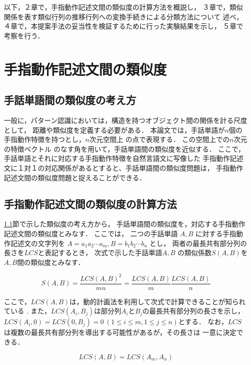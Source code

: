 以下，２章で，手指動作記述文間の類似度の計算方法を概説し，
３章で，類似関係を表す類似行列の推移行列への変換手続きによる分類方法について
述べ，４章で，本提案手法の妥当性を検証するために行った実験結果を示し，
５章で考察を行う．

\section {手指動作記述文間の類似度}

\subsection {手話単語間の類似度の考え方}\label{idea}

一般に，パターン認識においては，構造を持つオブジェクト間の関係を計る尺度として，
距離や類似度を定義する必要がある\cite{Tanaka1990}．
本論文では，手話単語が$n$個の手指動作特徴を持つとし，$n$次元空間上
の点で表現する．
この空間上での$n$次元の特徴ベクトル
のなす角を用いて，手話単語間の類似度を近似する．
ここで，手話単語とそれに対応する手指動作特徴を自然言語文に写像した
手指動作記述文に１対１の対応関係があるとすると、手話単語間の類似度問題は，
手指動作記述文間の類似度問題と捉えることができる．

\subsection {手指動作記述文間の類似度の計算方法}

\ref{idea}節で示した類似度の考え方から，
手話単語間の類似度を，対応する手指動作記述文間の類似度とみなす．
ここでは，
二つの手話単語 $A, B$ に対する手指動作記述文の文字列を
$A = a_1 a_2 \cdots a_m, B = b_1 b_2 \cdots b_n$  とし，
両者の最長共有部分列の長さを$LCS$と表記するとき，
次式で示した手話単語$A,B$ の類似係数$S(A, B)$を
$A,B$間の類似度とみなす\cite{Adachi1993a}．

\begin{equation}
\label{sim}
S(A, B) = \frac{LCS(A,B)^2}{mn} = \frac{LCS(A,B)}{m}\frac{LCS(A,B)}{n}
\end{equation}

ここで，$LCS(A,B)$は，動的計画法を利用して次式で計算できることが知られている
\cite{Thomas1990}.
また，$LCS(A_i,B_j)$は部分列$A_i$と$B_j$の最長共有部分列の長さを示し，
$LCS(A_i,0)=LCS(0,B_j)=0\  (1\le i \le m, 1\le j \le n)$とする．
なお，$LCS$は複数の最長共有部分列を導出する可能性があるが，その長さは
一意に決定できる．

\begin{equation}
LCS ( A, B ) = LCS ( A_m, A_n )
\end{equation}

